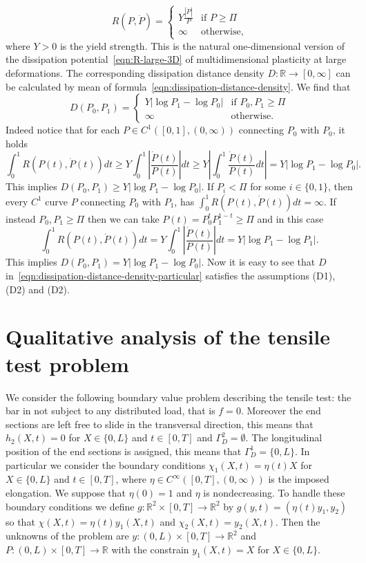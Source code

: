 \documentclass[a4paper,10pt,oneside]{amsbook}
\numberwithin{section}{chapter}
\numberwithin{equation}{chapter}
\theoremstyle{definition}
\begin{document}
\begin{equation}
R(P,\dot P)=
\begin{cases}
Y\frac{|\dot P|}{P} & \text{if $P\ge\Pi$} \\
\infty & \text{otherwise},
\end{cases}
\end{equation}
where $Y>0$ is the yield strength. This is the natural one-dimensional version of the dissipation potential~\eqref{eqn:R-large-3D} of multidimensional plasticity at large deformations. The corresponding dissipation distance density $D\colon\mathbb{R}\to[0,\infty]$ can be calculated by mean of formula~\eqref{eqn:dissipation-distance-density}. We find that
\begin{equation}
\label{eqn:dissipation-distance-density-particular}
D(P_0,P_1)=
\begin{cases}
Y|\log P_1-\log P_0| & \text{if $P_0,P_1\ge\Pi$} \\
\infty & \text{otherwise}.
\end{cases}
\end{equation}
Indeed notice that for each $P\in C^1([0,1],(0,\infty))$ connecting $P_0$ with $P_0$, it holds
\[
\int_0^1R(P(t),\dot{P}(t))dt\ge Y\int_0^1\left|\frac{\dot{P}(t)}{P(t)}\right|dt\ge Y\left|\int_0^1\frac{\dot{P}(t)}{P(t)}dt\right|=Y|\log P_1-\log P_0|.
\]
This implies $D(P_0,P_1)\ge Y|\log P_1-\log P_0|$. If $P_i<\Pi$ for some $i\in\{0,1\}$, then every $C^1$ curve $P$ connecting $P_0$ with $P_1$, has $\int_0^1R(P(t),\dot{P}(t))dt=\infty$. If instead $P_0,P_1\ge\Pi$ then we can take $P(t)=P_0^tP_1^{1-t}\ge\Pi$ and in this case
\[
\int_0^1R(P(t),\dot{P}(t))dt=Y\int_0^1\left|\frac{\dot{P}(t)}{P(t)}\right|dt=Y|\log P_1-\log P_1|.
\]
This implies $D(P_0,P_1)=Y|\log P_1-\log P_0|$. Now it is easy to see that $D$ in~\eqref{eqn:dissipation-distance-density-particular} satisfies the assumptions (D1), (D2) and (D2).

\section{Qualitative analysis of the tensile test problem}
\label{sec:qualitative}

We consider the following boundary value problem describing the tensile test: the bar in not subject to any distributed load, that is $f=0$. Moreover the end sections are left free to slide in the transversal direction, this means that $h_2(X,t)=0$ for $X\in\{0,L\}$ and $t\in[0,T]$ and $\Gamma_D^2=\emptyset$. The longitudinal position of the end sections is assigned, this means that $\Gamma_D^1=\{0,L\}$. In particular we consider the boundary conditions $\chi_1(X,t)=\eta(t)X$ for $X\in\{0,L\}$ and $t\in[0,T]$, where $\eta\in C^\infty([0,T],(0,\infty))$ is the imposed elongation. We suppose that $\eta(0)=1$ and $\eta$ is nondecreasing. To handle these boundary conditions we define $g\colon\mathbb{R}^2\times[0,T]\to\mathbb{R}^2$ by $g(y,t)=(\eta(t)y_1,y_2)$ so that $\chi(X,t)=\eta(t)y_1(X,t)$ and $\chi_2(X,t)=y_2(X,t)$. Then the unknowns of the problem are $y\colon(0,L)\times[0,T]\to\mathbb{R}^2$ and $P\colon(0,L)\times[0,T]\to\mathbb{R}$ with the constrain $y_1(X,t)=X$ for $X\in\{0,L\}$.
\end{document}
